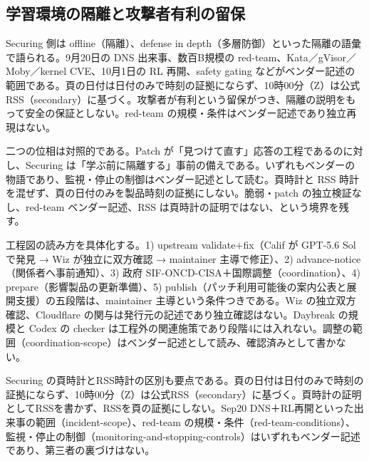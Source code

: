 \documentclass[lualatex,a4paper,10pt]{jlreq}
\begin{document}
\subsection*{学習環境の隔離と攻撃者有利の留保}


Securing 側は offline（隔離）、defense in depth（多層防御）といった隔離の語彙で語られる。9月20日の DNS 出来事、数百B規模の red-team、Kata／gVisor／Moby／kernel CVE、10月1日の RL 再開、safety gating などがベンダー記述の範囲である。頁の日付は日付のみで時刻の証拠にならず、10時00分（Z）は公式 RSS（secondary）に基づく。攻撃者が有利という留保がつき、隔離の説明をもって安全の保証としない。red-team の規模・条件はベンダー記述であり独立再現はない。


二つの位相は対照的である。Patch が「見つけて直す」応答の工程であるのに対し、Securing は「学ぶ前に隔離する」事前の備えである。いずれもベンダーの物語であり、監視・停止の制御はベンダー記述として読む。頁時計と RSS 時計を混ぜず、頁の日付のみを製品時刻の証拠にしない。脆弱・patch の独立検証なし、red-team ベンダー記述、RSS は頁時計の証明ではない、という境界を残す。


工程図の読み方を具体化する。1) upstream validate+fix（Calif が GPT-5.6 Sol で発見 → Wiz が独立に双方確認 → maintainer 主導で修正）、2) advance-notice（関係者へ事前通知）、3) 政府 SIF-ONCD-CISA＋国際調整（coordination）、4) prepare（影響製品の更新準備）、5) publish（パッチ利用可能後の案内公表と展開支援）の五段階は、maintainer 主導という条件つきである。Wiz の独立双方確認、Cloudflare の関与は発行元の記述であり独立確認はない。Daybreak の規模と Codex の checker は工程外の関連施策であり段階4には入れない。調整の範囲（coordination-scope）はベンダー記述として読み、確認済みとして書かない。


Securing の頁時計とRSS時計の区別も要点である。頁の日付は日付のみで時刻の証拠にならず、10時00分（Z）は公式RSS（secondary）に基づく。頁時計の証明としてRSSを書かず、RSSを頁の証拠にしない。Sep20 DNS＋RL再開といった出来事の範囲（incident-scope）、red-team の規模・条件（red-team-conditions）、監視・停止の制御（monitoring-and-stopping-controls）はいずれもベンダー記述であり、第三者の裏づけはない。
\end{document}
